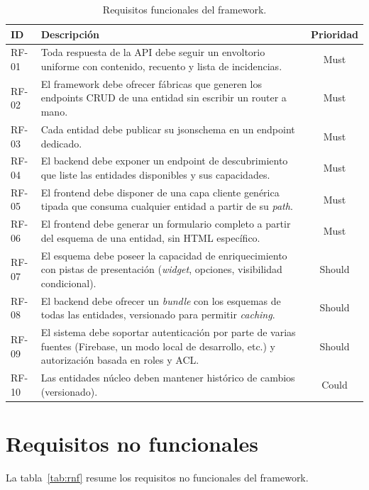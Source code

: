 \begin{table}[!htbp]
\caption{Requisitos funcionales del framework.}
\label{tab:rf}
\centering
\begin{tabular}{|l|p{8.5cm}|c|}
\hline
\textbf{ID} & \textbf{Descripción} & \textbf{Prioridad} \\ \hline
RF-01 & Toda respuesta de la API debe seguir un envoltorio uniforme con
contenido, recuento y lista de incidencias. & Must \\ \hline
RF-02 & El framework debe ofrecer fábricas que generen los endpoints CRUD de
una entidad sin escribir un router a mano. & Must \\ \hline
RF-03 & Cada entidad debe publicar su \gls{jsonschema} en un endpoint
dedicado. & Must \\ \hline
RF-04 & El backend debe exponer un endpoint de descubrimiento que liste las
entidades disponibles y sus capacidades. & Must \\ \hline
RF-05 & El frontend debe disponer de una capa cliente genérica tipada que
consuma cualquier entidad a partir de su \emph{path}. & Must \\ \hline
RF-06 & El frontend debe generar un formulario completo a partir del esquema
de una entidad, sin HTML específico. & Must \\ \hline
RF-07 & El esquema debe poseer la capacidad de enriquecimiento con pistas de presentación
(\emph{widget}, opciones, visibilidad condicional). & Should \\ \hline
RF-08 & El backend debe ofrecer un \emph{bundle} con los esquemas de todas las
entidades, versionado para permitir \emph{caching}. & Should \\ \hline
RF-09 & El sistema debe soportar autenticación por parte de varias fuentes (Firebase, un modo local de
desarrollo, etc.) y autorización basada en roles y ACL. & Should \\ \hline
RF-10 & Las entidades núcleo deben mantener histórico de cambios
(versionado). & Could \\ \hline
\end{tabular}
\end{table}

\section{Requisitos no funcionales}
La tabla~\ref{tab:rnf} resume los requisitos no funcionales del framework.

